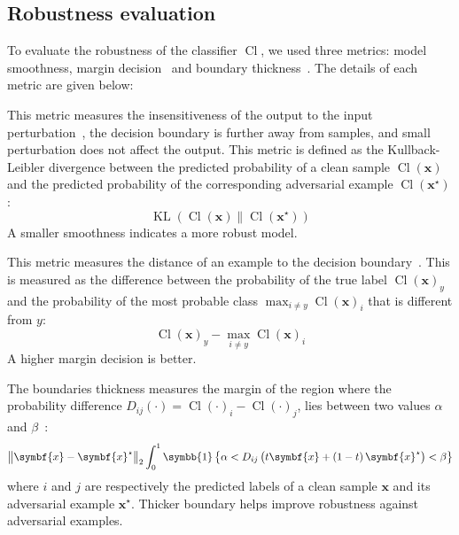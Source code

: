 \documentclass[../main.tex]{subfiles}
\begin{document}
	\subsection{Robustness evaluation}
		To evaluate the robustness of the classifier \(\operatorname{Cl}\), we used three metrics: model smoothness, margin decision~\cite{MarginDecision} and boundary thickness~\cite{AdvBoundaryThick}.
		The details of each metric are given below:
		\begin{description}[
				style=multiline,
				leftmargin=!,
				labelwidth=2.5cm
			]
			\item[Model smoothness]
				This metric measures the insensitiveness of the output to the input perturbation~\cite{MarginDecision}, \ie{} the decision boundary is further away from samples, and small perturbation does not affect the output.
				This metric is defined as the Kullback-Leibler divergence between the predicted probability of a clean sample \(\operatorname{Cl}\left(\symbf{x}\right)\) and the predicted probability of the corresponding adversarial example \(\operatorname{Cl}\left(\symbf{x}^{\star}\right)\):
				\begin{equation}
					\operatorname{KL}\left(\operatorname{Cl}\left(\symbf{x}\right) \| \operatorname{Cl}\left(\symbf{x}^{\star}\right)\right)
				\end{equation}
				A smaller smoothness indicates a more robust model.
			\item[Margin decision]
				This metric measures the distance of an example to the decision boundary~\cite{MarginDecision}.
				This is measured as the difference between the probability of the true label \(\operatorname{Cl}\left(\symbf{x}\right)_{y}\) and the probability of the most probable class \(\max_{i \neq y} \operatorname{Cl}\left(\symbf{x}\right)_{i}\) that is different from \(y\):
				\begin{equation}
					\operatorname{Cl}\left(\symbf{x}\right)_{y} - \max_{i \neq y} \operatorname{Cl}\left(\symbf{x}\right)_{i}
				\end{equation}
				A higher margin decision is better.
			\item[Boundary thickness]
				The boundaries thickness measures the margin of the region where the probability difference \(D_{ij}\left(\cdot\right) = \operatorname{Cl}\left(\cdot\right)_{i} - \operatorname{Cl}\left(\cdot\right)_{j}\), lies between two values \(\alpha\) and \(\beta\)~\cite{AdvBoundaryThick}:
				\begin{equation}
					\left\|\symbf{x} - \symbf{x}^{\star}\right\|_{2} \int_{0}^{1} \symbb{1}\left\{ \alpha < D_{ij}\left(t\symbf{x} + \left(1-t\right)\symbf{x}^{\star} \right) < \beta\right\}
				\end{equation}
				where \(i\) and \(j\) are respectively the predicted labels of a clean sample \(\symbf{x}\) and its adversarial example \(\symbf{x}^{\star}\).
				Thicker boundary helps improve robustness against adversarial examples.
		\end{description}
\end{document}
